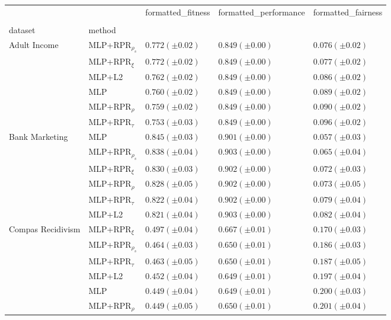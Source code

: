 \begin{tabular}{lllll}
\toprule
 &  & formatted_fitness & formatted_performance & formatted_fairness \\
 &  &  &  &  \\
dataset & method &  &  &  \\
\midrule
\multirow[t]{6}{*}{Adult Income} & MLP+RPR$_{\rho_s}$ & $0.772 (\pm0.02)$ & $0.849 (\pm0.00)$ & $0.076 (\pm0.02)$ \\
 & MLP+RPR$_{\xi}$ & $0.772 (\pm0.02)$ & $0.849 (\pm0.00)$ & $0.077 (\pm0.02)$ \\
 & MLP+L2 & $0.762 (\pm0.02)$ & $0.849 (\pm0.00)$ & $0.086 (\pm0.02)$ \\
 & MLP & $0.760 (\pm0.02)$ & $0.849 (\pm0.00)$ & $0.089 (\pm0.02)$ \\
 & MLP+RPR$_{\rho}$ & $0.759 (\pm0.02)$ & $0.849 (\pm0.00)$ & $0.090 (\pm0.02)$ \\
 & MLP+RPR$_{\tau}$ & $0.753 (\pm0.03)$ & $0.849 (\pm0.00)$ & $0.096 (\pm0.02)$ \\
\cline{1-5}
\multirow[t]{6}{*}{Bank Marketing} & MLP & $0.845 (\pm0.03)$ & $0.901 (\pm0.00)$ & $0.057 (\pm0.03)$ \\
 & MLP+RPR$_{\rho_s}$ & $0.838 (\pm0.04)$ & $0.903 (\pm0.00)$ & $0.065 (\pm0.04)$ \\
 & MLP+RPR$_{\xi}$ & $0.830 (\pm0.03)$ & $0.902 (\pm0.00)$ & $0.072 (\pm0.03)$ \\
 & MLP+RPR$_{\rho}$ & $0.828 (\pm0.05)$ & $0.902 (\pm0.00)$ & $0.073 (\pm0.05)$ \\
 & MLP+RPR$_{\tau}$ & $0.822 (\pm0.04)$ & $0.902 (\pm0.00)$ & $0.079 (\pm0.04)$ \\
 & MLP+L2 & $0.821 (\pm0.04)$ & $0.903 (\pm0.00)$ & $0.082 (\pm0.04)$ \\
\cline{1-5}
\multirow[t]{6}{*}{Compas Recidivism} & MLP+RPR$_{\xi}$ & $0.497 (\pm0.04)$ & $0.667 (\pm0.01)$ & $0.170 (\pm0.03)$ \\
 & MLP+RPR$_{\rho_s}$ & $0.464 (\pm0.03)$ & $0.650 (\pm0.01)$ & $0.186 (\pm0.03)$ \\
 & MLP+RPR$_{\tau}$ & $0.463 (\pm0.05)$ & $0.650 (\pm0.01)$ & $0.187 (\pm0.05)$ \\
 & MLP+L2 & $0.452 (\pm0.04)$ & $0.649 (\pm0.01)$ & $0.197 (\pm0.04)$ \\
 & MLP & $0.449 (\pm0.04)$ & $0.649 (\pm0.01)$ & $0.200 (\pm0.03)$ \\
 & MLP+RPR$_{\rho}$ & $0.449 (\pm0.05)$ & $0.650 (\pm0.01)$ & $0.201 (\pm0.04)$ \\
\cline{1-5}

\end{tabular}
